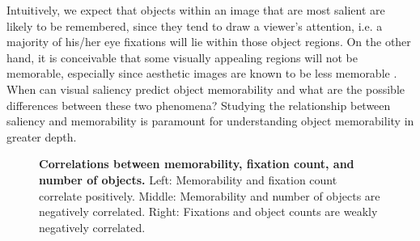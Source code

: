 Intuitively, we expect that objects within an image that are most salient are likely to be remembered, since they tend to draw a viewer's attention, i.e. a majority of his/her eye fixations will lie within those object regions. On the other hand, it is conceivable that some visually appealing regions will not be memorable, especially since aesthetic images are known to be less memorable \cite{isola11,isola14}. When can visual saliency predict object memorability and what are the possible differences between these two phenomena? Studying the relationship between saliency and memorability is paramount for understanding object memorability in greater depth.

\begin{figure}[!htb]
\centering
{}
\vspace{-5mm}\caption{\footnotesize\textbf{Correlations between memorability, fixation count, and number of objects.} Left: Memorability and fixation count correlate positively. Middle:  Memorability and number of objects are negatively correlated. Right: Fixations and object counts are weakly negatively correlated.}\label{fig:scatterFixation}
\end{figure}


